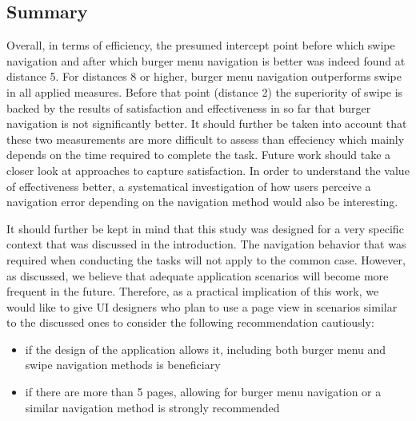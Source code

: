 \documentclass{sig-alternate-05-2015}
\begin{document}
\subsection{Summary}
Overall, in terms of efficiency, the presumed intercept point before which swipe navigation and after which burger menu navigation is better was indeed found at 
distance 5. For distances 8 or higher, burger menu navigation outperforms swipe in all applied measures. 
Before that point (distance 2) the superiority of swipe is backed by the results of satisfaction and effectiveness in so far that burger navigation is not significantly 
better. It should further be taken into account that these two measurements are more difficult to assess than effeciency which mainly depends on the time required to complete the task. Future work
should take a closer look at approaches to capture satisfaction. In order to understand the value of effectiveness better, a systematical investigation of how users perceive
a navigation error depending on the navigation method would also be interesting.

It should further be kept in mind that this study was designed for a very specific context that was discussed in the introduction. The navigation behavior that was required
when conducting the tasks will not apply to the common case. However, as discussed, we believe that adequate application scenarios will become more frequent in the future. 
Therefore, as a practical implication of this work, we would like to give UI designers who plan to use a page view in scenarios similar to the discussed ones
to consider the following recommendation cautiously:
\begin{itemize}
  \item if the design of the application allows it, including both burger menu and swipe navigation methods is beneficiary
  \item if there are more than 5 pages, allowing for burger menu navigation or a similar navigation method is strongly recommended
\end{itemize}
\end{document}

